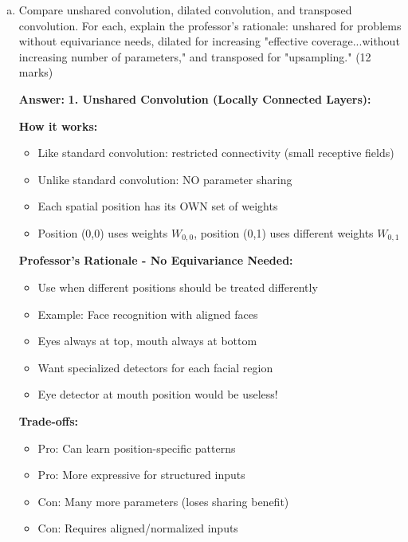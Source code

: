 \documentclass[12pt]{article}
\newcommand{\answer}[1]{{\color{answercolor}\textbf{Answer:} #1}}
\newcommand{\explanation}[1]{{\color{explanationcolor}#1}}
\begin{document}
\begin{enumerate}[(a)]
    \item Compare unshared convolution, dilated convolution, and transposed convolution. For each, explain the professor's rationale: unshared for problems without equivariance needs, dilated for increasing "effective coverage...without increasing number of parameters," and transposed for "upsampling." \hfill (12 marks)
    
    \answer{
    \textbf{1. Unshared Convolution (Locally Connected Layers):}
    
    \explanation{
    \textbf{How it works:}
    \begin{itemize}
        \item Like standard convolution: restricted connectivity (small receptive fields)
        \item Unlike standard convolution: NO parameter sharing
        \item Each spatial position has its OWN set of weights
        \item Position (0,0) uses weights $W_{0,0}$, position (0,1) uses different weights $W_{0,1}$
    \end{itemize}
    
    \textbf{Professor's Rationale - No Equivariance Needed:}
    \begin{itemize}
        \item Use when different positions should be treated differently
        \item Example: Face recognition with aligned faces
        \item Eyes always at top, mouth always at bottom
        \item Want specialized detectors for each facial region
        \item Eye detector at mouth position would be useless!
    \end{itemize}
    
    \textbf{Trade-offs:}
    \begin{itemize}
        \item Pro: Can learn position-specific patterns
        \item Pro: More expressive for structured inputs
        \item Con: Many more parameters (loses sharing benefit)
        \item Con: Requires aligned/normalized inputs
    \end{itemize}
    }
    
}
\end{enumerate}
\end{document}
